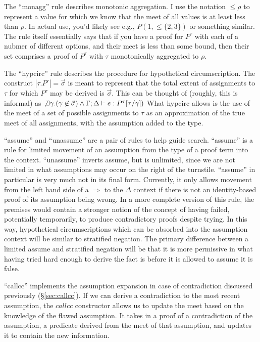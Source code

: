 The ``monagg'' rule describes monotonic aggregation.
I use the notation $\leq \rho$ to represent a value for which we know that the meet of all values is at least less than $\rho$.
In actual use, you'd likely see e.g., $P(1, \leq \{2, 3\})$ or something similar.
The rule itself essentially says that if you have a proof for $P^\tau$ with each of a nubmer of different options, and their meet is less than some bound, then their set comprises a proof of $P^\tau$ with $\tau$ monotonically aggregated to $\rho$.

The ``hypcirc'' rule describes the procedure for hypothetical circumscription.
The construct $|\tau.P^\tau| = \vec{\sigma}$ is meant to represent that the total extent of assignments to $\tau$ for which $P^\tau$ may be derived is $\vec{\sigma}$.
This can be thought of (roughly, this is informal) as $\not \exists \gamma. (\gamma \not \in \vec{\sigma}) \wedge \Gamma; \Delta \vdash e : P^\tau[\tau/\gamma])$
What hypcirc allows is the use of the meet of a set of possible assignments to $\tau$ as an approximation of the true meet of all assignments, with the assumption added to the type.

``assume'' and ``unassume'' are a pair of rules to help guide search.
``assume'' is a rule for limited movement of an assumption from the type of a proof term into the context.
``unassume'' inverts assume, but is unlimited, since we are not limited in what assumptions may occur on the right of the turnstile.
``assume'' in particular is very much not in its final form.
Currently, it only allows movement from the left hand side of a $\Rightarrow$ to the $\Delta$ context if there is not an identity-based proof of its assumption being wrong.
In a more complete version of this rule, the premises would contain a stronger notion of the concept of having failed, potentially temporarily, to produce contradictory proofs despite trying.
In this way, hypothetical circumscriptions which can be absorbed into the assumption context will be similar to stratified negation.
The primary difference between a limited assume and stratified negation will be that it is more permissive in what having tried hard enough to derive the fact is before it is allowed to assume it is false.

``callcc'' implements the assumption expansion in case of contradiction discussed previously (\S \ref{sec:callcc}).
If we can derive a contradiction to the most recent assumption, the $callcc$ constructor allows us to update the meet based on the knowledge of the flawed assumption.
It takes in a proof of a contradiction of the assumption, a predicate derived from the meet of that assumption, and updates it to contain the new information.

